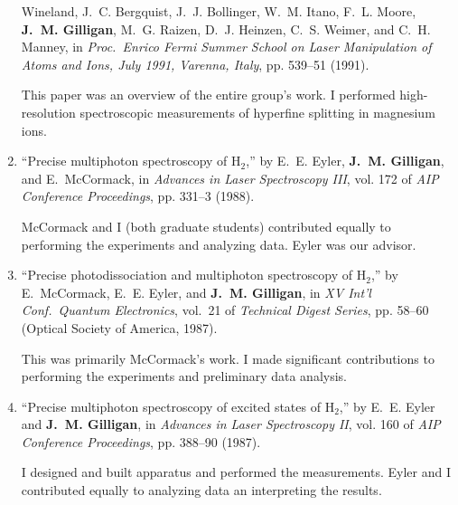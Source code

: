 \begin{enumerate}
	  Wineland, J.~C. Bergquist, J.~J. Bollinger, W.~M. Itano, F.~L. Moore, \textbf{J.~M.
	  Gilligan}, M.~G. Raizen, D.~J. Heinzen, C.~S. Weimer, and C.~H. Manney, in
	  \emph{Proc.\ Enrico Fermi Summer School on Laser Manipulation of Atoms and
	  Ions, {J}uly 1991, {V}arenna, {I}taly}, pp. 539--51 (1991). 
	  \begin{credit}
	   This paper was an overview of the entire group's work. I performed high-resolution spectroscopic measurements of hyperfine splitting in magnesium ions.
	  \end{credit}
	\item
	\enquote{Precise multiphoton spectroscopy of {H$_2$},}  by E.~E. Eyler, \textbf{J.~M.
	  Gilligan}, and E.~McCormack, in \emph{Advances in Laser Spectroscopy III},
	  vol. 172 of \emph{AIP Conference Proceedings}, pp. 331--3 (1988). 
	  \begin{credit}
	   McCormack and I (both graduate students) contributed equally to performing the experiments and analyzing data. Eyler was our advisor.
	  \end{credit}
	\item
	\enquote{Precise photodissociation and multiphoton spectroscopy of {H$_2$},}
	  by E.~McCormack, E.~E. Eyler, and \textbf{J.~M. Gilligan}, in \emph{XV Int'l Conf.\
	  Quantum Electronics}, vol.~21 of \emph{Technical Digest Series}, pp. 58--60
	  (Optical Society of America, 1987). 
	  \begin{credit}
	   This was primarily McCormack's work. I made significant contributions to performing the experiments and preliminary data analysis.
	  \end{credit}
	\item
	\enquote{Precise multiphoton spectroscopy of excited states of {H$_2$},}  by
	  E.~E. Eyler and \textbf{J.~M. Gilligan}, in \emph{Advances in Laser Spectroscopy II},
	  vol. 160 of \emph{AIP Conference Proceedings}, pp. 388--90 (1987). 
	  \begin{credit}
	   I designed and built apparatus and performed the measurements. Eyler and I contributed equally to analyzing data an interpreting the results.
	  \end{credit}
\end{enumerate}
